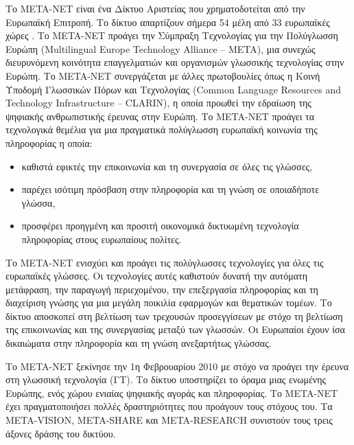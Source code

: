 \documentclass[]{../../metanetpaper}
\begin{document}
\begin{multicols}{2}
   Το META-NET είναι ένα Δίκτυο Αριστείας που χρηματοδοτείται από την Ευρωπαϊκή Επιτροπή. Το δίκτυο απαρτίζουν σήμερα 54 μέλη από 33 ευρωπαϊκές χώρες \cite{rehm2011}. Το META-NET προάγει την Σύμπραξη Τεχνολογίας για την Πολύγλωσση Ευρώπη (Multilingual Europe Technology Alliance -- META), μια συνεχώς διευρυνόμενη κοινότητα επαγγελματιών και οργανισμών γλωσσικής τεχνολογίας στην Ευρώπη. Το META-NET συνεργάζεται με άλλες πρωτοβουλίες όπως η Κοινή Υποδομή Γλωσσικών Πόρων και Τεχνολογίας (Common Language Resources and Technology Infrastructure -- CLARIN), η οποία προωθεί την εδραίωση της ψηφιακής ανθρωπιστικής έρευνας στην Ευρώπη. Το META-NET προάγει τα τεχνολογικά θεμέλια για μια πραγματικά πολύγλωσση ευρωπαϊκή κοινωνία της πληροφορίας η οποία:

\begin{itemize}
\item  καθιστά εφικτές την επικοινωνία και τη συνεργασία σε όλες τις γλώσσες,
\item παρέχει ισότιμη πρόσβαση στην πληροφορία και τη γνώση σε οποιαδήποτε γλώσσα,
\item προσφέρει προηγμένη και προσιτή οικονομικά δικτυωμένη τεχνολογία πληροφορίας στους ευρωπαίους πολίτες.
\end{itemize}

Το META-NET ενισχύει και προάγει τις πολύγλωσσες τεχνολογίες για όλες τις ευρωπαϊκές γλώσσες. Οι τεχνολογίες αυτές καθιστούν δυνατή την αυτόματη μετάφραση, την παραγωγή περιεχομένου, την επεξεργασία πληροφορίας και τη διαχείριση γνώσης για μια μεγάλη ποικιλία εφαρμογών και θεματικών τομέων. Το δίκτυο αποσκοπεί στη βελτίωση των τρεχουσών προσεγγίσεων με στόχο τη βελτίωση της επικοινωνίας και της συνεργασίας μεταξύ των γλωσσών. Οι Ευρωπαίοι έχουν ίσα δικαιώματα στην πληροφορία και τη γνώση ανεξαρτήτως γλώσσας.

Το META-NET ξεκίνησε την 1η Φεβρουαρίου 2010 με στόχο να προάγει την έρευνα στη γλωσσική τεχνολογία (ΓΤ). Το δίκτυο υποστηρίζει το  όραμα μιας ενωμένης Ευρώπης, ενός χώρου ενιαίας ψηφιακής αγοράς και πληροφορίας. Το META-NET έχει πραγματοποιήσει πολλές  δραστηριότητες που προάγουν τους στόχους του. Τα META-VISION, META-SHARE και META-RESEARCH συνιστούν τους τρεις άξονες δράσης του δικτύου. 


\end{multicols}
\end{document}
